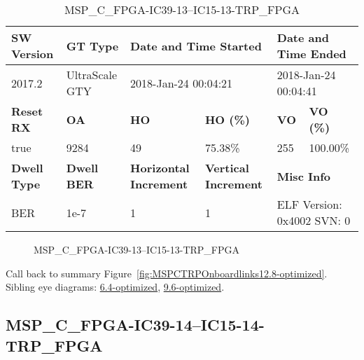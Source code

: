 \begin{table}[h]
\centering
\caption{MSP\_C\_FPGA-IC39-13--IC15-13-TRP\_FPGA}
\label{tab:MSPCFPGAIC3913IC1513TRPFPGA12.8-optimized}
\begin{tabular}{@{}|l|l|l|l|l|l|@{}}
\toprule
\textbf{SW Version}                & \textbf{GT Type}   & \multicolumn{2}{l|}{\textbf{Date and Time Started}}            & \multicolumn{2}{l|}{\textbf{Date and Time Ended}}        \\ \midrule
2017.2                       & UltraScale GTY          & \multicolumn{2}{l|}{2018-Jan-24 00:04:21}                   & \multicolumn{2}{l|}{2018-Jan-24 00:04:41}               \\ \midrule
\textbf{Reset RX}                  & \textbf{OA} & \textbf{HO}   & \textbf{HO (\%)} & \textbf{VO} & \textbf{VO (\%)} \\ \midrule
true & 9284        & 49          & 75.38\%        & 255        & 100.00\%       \\ \midrule
\textbf{Dwell Type}                & \textbf{Dwell BER} & \textbf{Horizontal Increment} & \textbf{Vertical Increment}    & \multicolumn{2}{l|}{\textbf{Misc Info}}                  \\ \midrule
BER                            & 1e-7        & 1        & 1           & \multicolumn{2}{l|}{ELF Version: 0x4002 SVN: 0}                         \\ \bottomrule
\end{tabular}
\end{table}

\begin{figure}[h]
\caption{MSP\_C\_FPGA-IC39-13--IC15-13-TRP\_FPGA} \label{fig:MSPCFPGAIC3913IC1513TRPFPGA12.8-optimized}
\end{figure}

Call back to summary Figure~\ref{fig:MSPCTRPOnboardlinks12.8-optimized}.
Sibling eye diagrams: \hyperref[sec:MSPCFPGAIC3913IC1513TRPFPGA6.4-optimized]{6.4-optimized}, \hyperref[sec:MSPCFPGAIC3913IC1513TRPFPGA9.6-optimized]{9.6-optimized}.

\clearpage
\newpage


\subsection{MSP\_C\_FPGA-IC39-14--IC15-14-TRP\_FPGA}\label{sec:MSPCFPGAIC3914IC1514TRPFPGA12.8-optimized}

